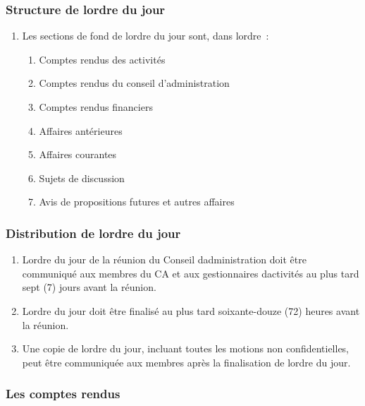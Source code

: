 \subsubsection{Structure de l\textquotesingle ordre du jour}
\label{structure-de-lordre-du-jour}

\begin{enumerate}
 \item
  Les sections de fond de l\textquotesingle ordre du jour sont, dans l\textquotesingle ordre~:

  \begin{enumerate}
   \item
    Comptes rendus des activités
   \item
    Comptes rendus du conseil d’administration
   \item
    Comptes rendus financiers
   \item
    Affaires antérieures
   \item
    Affaires courantes
   \item
    Sujets de discussion
   \item
    Avis de propositions futures et autres affaires
  \end{enumerate}

\end{enumerate}

\subsubsection{Distribution de l\textquotesingle ordre du jour}
\label{distribution-de-lordre-du-jour}

\begin{enumerate}
 \item
  L\textquotesingle ordre du jour de la réunion du Conseil d\textquotesingle administration doit être communiqué aux membres du CA et aux gestionnaires d\textquotesingle activités au plus tard sept (7) jours avant la réunion.
 \item
  L\textquotesingle ordre du jour doit être finalisé au plus tard soixante-douze (72) heures avant la réunion.
 \item
  Une copie de l\textquotesingle ordre du jour, incluant toutes les motions non confidentielles, peut être communiquée aux membres après la finalisation de l\textquotesingle ordre du jour.
\end{enumerate}

\subsubsection{Les comptes rendus}
\label{les-comptes-rendus-reunions}

